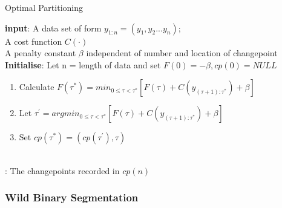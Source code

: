 \documentclass{article}
\begin{document}
\begin{algorithm}
\caption{Optimal Partitioning}\label{alg:cap}

\textbf{input}: A data set of form $y_{1:n} = (y_{1},y_{2}...y_{n})$;\\
\qquad \quad  A cost function $C(\cdot)$\\
\qquad \quad  A penalty constant $\beta$ independent of number and location of changepoint\\
\textbf{Initialise}: Let n = length of data and set $F(0) = -\beta, cp(0) = NULL$\\
\begin{algorithmic}
    \begin{enumerate}
        \item Calculate $F(\tau^{*}) = min_{0 \leq \tau < \tau^{*}} [F(\tau) + C(y_{(\tau+1) : \tau^{*}}) + \beta]$
        \item Let $\tau^{'} = argmin_{0 \leq \tau < \tau^{*}} [F(\tau) + C(y_{(\tau+1) : \tau^{*}}) + \beta]$
        \item Set $ cp(\tau^{*}) = (cp(\tau^{'}) , \tau)$
    \end{enumerate}
\EndFor\\
\Return : The changepoints recorded in $cp(n)$ 
\end{algorithmic}
\end{algorithm}


\subsubsection{Wild Binary Segmentation}
\end{document}
